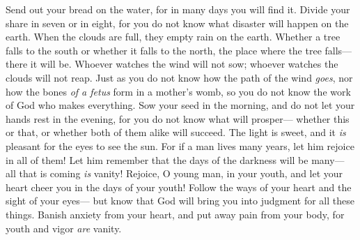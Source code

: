 \begin{biblechapter} %
 Send out your bread on the water, 
for in many days you will find it.
\verse Divide your share in seven or in eight, 
for you do not know what disaster will happen on the earth.
\verse When the clouds are full, 
they empty rain on the earth. 
Whether a tree falls to the south or whether it falls to the north, 
the place where the tree falls—there it will be.
\verse Whoever watches the wind will not sow; 
whoever watches the clouds will not reap.
\verse Just as you do not know how the path of the wind \textit{goes}, 
nor how the bones \textit{of a fetus} form in a mother’s womb, 
so you do not know the work of God who makes everything.
\verse Sow your seed in the morning, 
and do not let your hands rest in the evening, 
for you do not know what will prosper— 
whether this or that, or whether both of them alike will succeed.
 The light is sweet, 
and it \textit{is} pleasant for the eyes to see the sun.
\verse For if a man lives many years, 
let him rejoice in all of them! 
Let him remember that the days of the darkness will be many— 
all that is coming \textit{is} vanity!
\verse Rejoice, O young man, in your youth, 
and let your heart cheer you in the days of your youth! 
Follow the ways of your heart and the sight of your eyes— 
but know that God will bring you into judgment for all these things.
\verse Banish anxiety from your heart, 
and put away pain from your body, 
for youth and vigor \textit{are} vanity.
\end{biblechapter}

